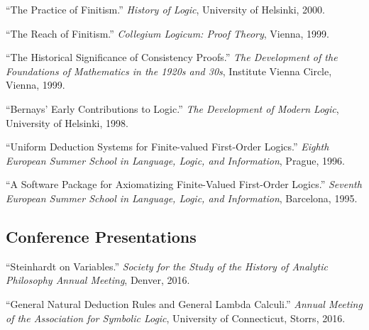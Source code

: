 \documentclass[11pt]{article}
\def\printdate#1{\xprintdate#1-}
\def\xprintdate#1-#2-#3-{#1}
\begin{document}
\ind ``The Practice of Finitism.'' \emph{History of Logic}, University of Helsinki, \printdate{2000-06-12}.





\ind ``The Reach of Finitism.'' \emph{Collegium Logicum: Proof Theory}, Vienna, \printdate{1999-11-20}.


\ind ``The Historical Significance of Consistency Proofs.'' \emph{The Development of the Foundations of Mathematics in the 1920s and 30s}, Institute Vienna Circle, Vienna, \printdate{1999-06-02}.





\ind ``Bernays' Early Contributions to Logic.'' \emph{The Development of Modern Logic}, University of Helsinki, \printdate{1998-06-06}.






\ind ``Uniform Deduction Systems for Finite-valued First-Order Logics.'' \emph{Eighth European Summer School in Language, Logic, and Information}, Prague, \printdate{1996-08-00}.


\ind ``A Software Package for Axiomatizing Finite-Valued First-Order Logics.'' \emph{Seventh European Summer School in Language, Logic, and Information}, Barcelona, \printdate{1995-08-00}.


























\subsection{Conference Presentations}












\ind ``Steinhardt on Variables.'' \emph{Society for the Study of the History of Analytic Philosophy Annual
Meeting}, Denver, \printdate{2016-06-18}.


\ind ``General Natural Deduction Rules and General Lambda Calculi.'' \emph{Annual Meeting of the Association for Symbolic Logic}, University of Connecticut, Storrs, \printdate{2016-05-24}.
\end{document}
